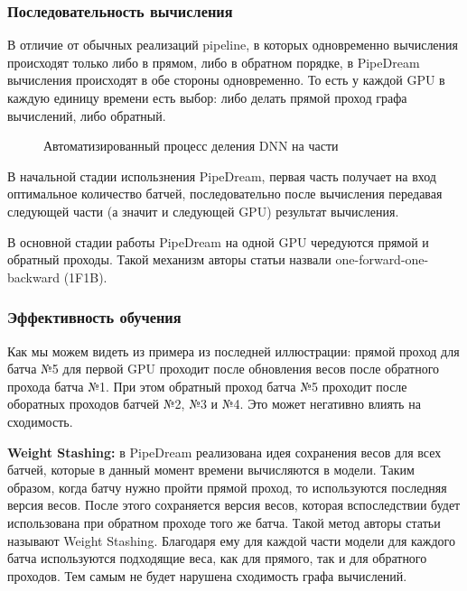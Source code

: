 \subsubsection{Последовательность вычисления}
\indent\setlength{\parindent}{1em}
В отличие от обычных реализаций pipeline, в которых одновременно вычисления происходят только либо в прямом, либо в обратном порядке, в PipeDream вычисления происходят в обе стороны одновременно. То есть у каждой GPU в каждую единицу времени есть выбор: либо делать прямой проход графа вычислений, либо обратный. 

\begin{figure}[h]%
	\centering
	\caption{Автоматизированный процесс деления DNN на части}
	\label{framework} %
\end{figure}

\indent\setlength{\parindent}{1em}  
В начальной стадии использнения PipeDream, первая часть получает на вход оптимальное количество батчей, последовательно после вычисления передавая следующей части (а значит и следующей GPU) результат вычисления. 

\indent\setlength{\parindent}{1em}  
В основной стадии работы PipeDream на одной GPU чередуются прямой и обратный проходы. Такой механизм авторы статьи назвали one-forward-one-backward (1F1B).

\newpage
\subsubsection{Эффективность обучения}
\indent\setlength{\parindent}{1em} 
Как мы можем видеть из примера из последней иллюстрации: прямой проход для батча №5 для первой GPU проходит после обновления весов после обратного прохода батча №1. При этом обратный проход батча №5 проходит после оборатных проходов батчей №2, №3 и №4. Это может негативно влиять на сходимость.

\indent\setlength{\parindent}{1em}
\textbf{Weight Stashing:} в PipeDream реализована идея сохранения весов для всех батчей, которые в данный момент времени вычисляются в модели. Таким образом, когда батчу нужно пройти прямой проход, то используются последняя версия весов. После этого сохраняется версия весов, которая вспоследствии будет использована при обратном проходе того же батча. Такой метод авторы статьи называют Weight Stashing. Благодаря ему для каждой части модели для каждого батча используются подходящие веса, как для прямого, так и для обратного проходов. Тем самым не будет нарушена сходимость графа вычислений.

